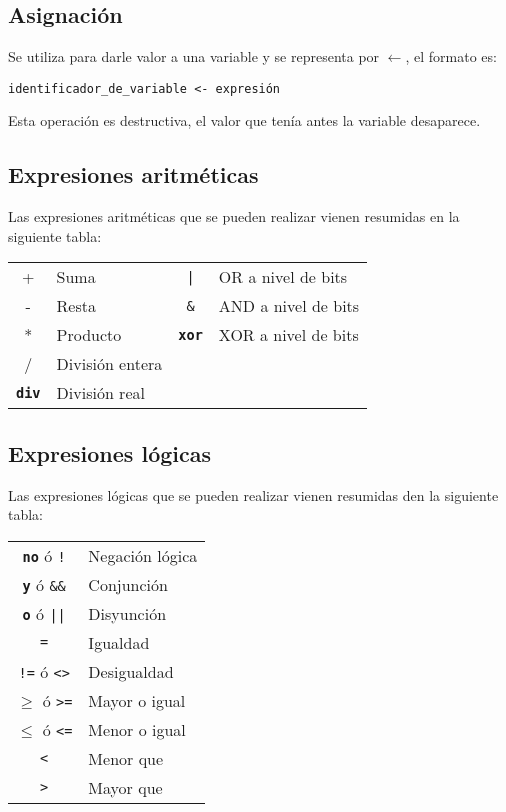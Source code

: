 \documentclass{article}
\newcommand{\pkeyword}[1]{\textcolor{azulpseudo}{\texttt{\textbf{#1}}}}
\begin{document}
\subsection{Asignación}
Se utiliza para darle valor a una variable y se representa por $\leftarrow$, el formato es:
\begin{lstlisting}[language = pseudocodigoesp]
identificador_de_variable <- expresión
\end{lstlisting}

Esta operación es destructiva, el valor que tenía antes la variable desaparece.
\subsection{Expresiones aritméticas}
Las expresiones aritméticas que se pueden realizar vienen resumidas en la siguiente tabla:
\begin{center}
  \begin{tabular}{| c | l | c | l}
    + & Suma & \texttt{|} & OR a nivel de bits\\[8pt]
    - & Resta & \texttt{\&} & AND a nivel de bits\\[8pt]
    * & Producto & \pkeyword{xor} & XOR a nivel de bits\\[8pt]
    / & División entera & &\\[8pt]
    \pkeyword{div} & División real & &
  \end{tabular} 
\end{center}
\subsection{Expresiones lógicas}
Las expresiones lógicas que se pueden realizar vienen resumidas den la siguiente tabla:

\begin{center}
  \begin{tabular}{| c | l |}
    \pkeyword{no} ó \texttt{!} & Negación lógica\\[8pt]
    \pkeyword{y} ó \texttt{\&\&} & Conjunción\\[8pt]
    \pkeyword{o} ó \texttt{||} & Disyunción\\[8pt]
    \texttt{=} & Igualdad\\[8pt]
    \texttt{!=} ó \texttt{<>} & Desigualdad\\[8pt]
    \texttt{$\geq$} ó \texttt{>=} & Mayor o igual \\[8pt]
    \texttt{$\leq$} ó \texttt{<=} & Menor o igual \\[8pt]
    \texttt{<} & Menor que \\[8pt]
    \texttt{>} & Mayor que \\[8pt]
  \end{tabular} 
\end{center}
\end{document}
